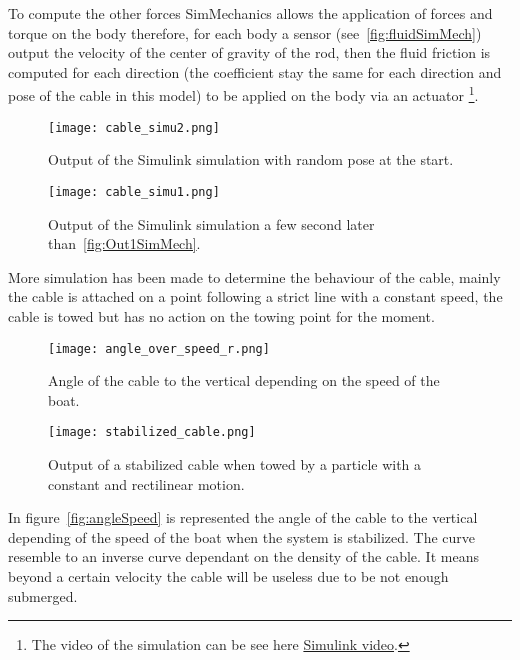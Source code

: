 To compute the other forces SimMechanics allows the application of forces and torque on the body therefore, for each
body a sensor (see~\ref{fig:fluidSimMech}) output the velocity of the center of gravity of the rod, then the 
fluid friction is computed for each direction (the coefficient stay the same for each direction and pose of the cable in this model) to be applied on the body via an actuator \footnote{The video of the simulation can be see here \href{https://youtu.be/xEDApnU54ac}{Simulink video}.}.

\begin{figure}[H]
\centering
    \begin{minipage}[b]{0.5\textwidth}
    \centering
    \texttt{[image: cable\_simu2.png]}
    \caption{Output of the Simulink simulation with random pose at the start.}
    \label{fig:Out1SimMech}
    \end{minipage}
    \hfill
    \begin{minipage}[b]{0.45\textwidth}
    \centering
    \texttt{[image: cable\_simu1.png]}
    \caption{Output of the Simulink simulation a few second later than~\ref{fig:Out1SimMech}.}
    \label{fig:Out2SimMech}
    \end{minipage}
\end{figure}


More simulation has been made to determine the behaviour of the cable, mainly the cable is attached on a point following a strict line with a constant speed, the cable is towed but has no action on the towing point for the moment.

\begin{figure}[H]
\centering
    \begin{minipage}[b]{0.4\textwidth}
    \centering
    \texttt{[image: angle\_over\_speed\_r.png]}
    \caption{Angle of the cable to the vertical depending on the speed of the boat.}
    \label{fig:angleSpeed}
    \end{minipage}
    \hfill
    \begin{minipage}[b]{0.45\textwidth}
    \centering
    \texttt{[image: stabilized\_cable.png]}
    \caption{Output of a stabilized cable when towed by a particle with a constant and rectilinear motion.}
    \label{fig:stabCable}
    \end{minipage}
\end{figure}

In figure~\ref{fig:angleSpeed} is represented the angle of the cable to the vertical depending of the speed of the 
boat when the system is stabilized. The curve resemble to an inverse curve dependant on the density of the cable.
It means beyond a certain velocity the cable will be useless due to be not enough submerged.

